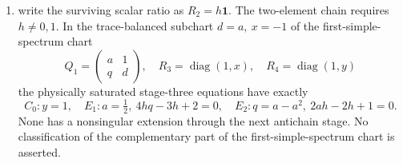 \begin{theorem}
\begin{enumerate}
and \(R_n=Q_1^{-1}Q_n\), then \(R_2\) is scalar.  A non-scalar \(R_2\)
reduces to an eigenline-swapping normal form, whose two exceptional
components are both eliminated by the following antichain stage.
\item write the surviving scalar ratio as \(R_2=h\mathbf1\).  The
two-element chain requires \(h\ne0,1\).  In the trace-balanced subchart
\(d=a,\ x=-1\) of the first-simple-spectrum chart
\begin{equation}
 Q_1=\begin{pmatrix}a&1\\q&d\end{pmatrix},\quad
 R_3=\operatorname{diag}(1,x),\quad
 R_4=\operatorname{diag}(1,y)
\label{eq:bcgr-delayed-component}
\end{equation}
the physically saturated stage-three equations have exactly
\[
C_0:y=1,\quad
E_1:a=\tfrac12,\ 4hq-3h+2=0,\quad
E_2:q=a-a^2,\ 2ah-2h+1=0.
\]
None has a nonsingular extension through the next antichain stage.  No
classification of the complementary part of the first-simple-spectrum
chart is asserted.
\end{enumerate}
\end{theorem}

